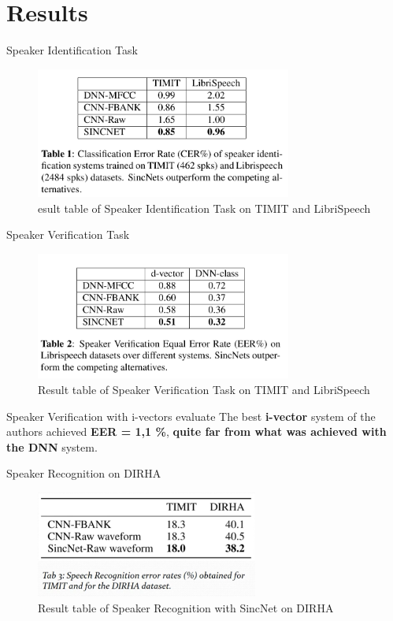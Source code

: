\documentclass[notheorems, aspectratio=54]{beamer}
\begin{document}
\section{Results}
\begin{frame}{Speaker Identification Task}
	\begin{figure}[H]
		\centering
		\includegraphics[width=0.75\textwidth]{images/performance_speaker_identification.png}
		\caption{esult table of Speaker Identification Task on TIMIT and LibriSpeech}
		\label{fig:writing-thesis}
	\end{figure}	
\end{frame}
\begin{frame}{Speaker Verification Task}
	\begin{figure}[H]
		\centering
		\includegraphics[width=0.75\textwidth]{images/performance_speaker_verification.png}
		\caption{Result table of Speaker Verification Task on TIMIT and LibriSpeech}
		\label{fig:writing-thesis}
	\end{figure}	
\end{frame}
\begin{frame}{Speaker Verification with i-vectors evaluate}
	The best \textbf {i-vector} system of the authors achieved \textbf{EER = 1,1 \%}, \textbf{quite far from what was achieved with the DNN} system.
\end{frame}
\begin{frame}{Speaker Recognition on DIRHA}
	\begin{figure}[H]
		\centering
		\includegraphics[width=0.65\textwidth]{images/sr_sincnet_result.png}
		\caption{Result table of Speaker Recognition with SincNet on DIRHA}
		\label{fig:writing-thesis}
	\end{figure}	
\end{frame}
\end{document}
